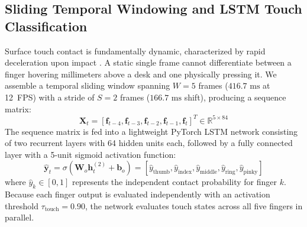 \documentclass[conference]{IEEEtran}
\begin{document}
\subsection{Sliding Temporal Windowing and LSTM Touch Classification}
Surface touch contact is fundamentally dynamic, characterized by rapid deceleration upon impact \cite{Simao2016Unsupervised, MacRitchie2015Integrating}. A static single frame cannot differentiate between a finger hovering millimeters above a desk and one physically pressing it. We assemble a temporal sliding window spanning $W = 5$ frames ($416.7\text{ ms}$ at 12~FPS) with a stride of $S = 2$ frames ($166.7\text{ ms}$ shift), producing a sequence matrix:
\begin{equation}
\mathbf{X}_t = \left[\mathbf{f}_{t-4}, \mathbf{f}_{t-3}, \mathbf{f}_{t-2}, \mathbf{f}_{t-1}, \mathbf{f}_t\right]^T \in \mathbb{R}^{5 \times 84}
\label{eq:temporal_window}
\end{equation}
The sequence matrix is fed into a lightweight PyTorch LSTM network consisting of two recurrent layers with 64 hidden units each, followed by a fully connected layer with a 5-unit sigmoid activation function:
\begin{equation}
\hat{\mathbf{y}}_t = \sigma\left(\mathbf{W}_o \mathbf{h}_t^{(2)} + \mathbf{b}_o\right) = \left[\hat{y}_{\text{thumb}}, \hat{y}_{\text{index}}, \hat{y}_{\text{middle}}, \hat{y}_{\text{ring}}, \hat{y}_{\text{pinky}}\right]
\label{eq:model_output}
\end{equation}
where $\hat{y}_k \in [0, 1]$ represents the independent contact probability for finger $k$. Because each finger output is evaluated independently with an activation threshold $\tau_{\text{touch}} = 0.90$, the network evaluates touch states across all five fingers in parallel.
\end{document}
